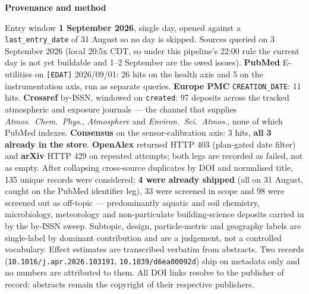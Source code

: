 \documentclass[10pt]{article}
\begin{document}
\vspace{4mm}
\begin{keybox}
{\sffamily\bfseries\footnotesize\color{Deep}Provenance and method}\\[1.2mm]
{\fontsize{7.2}{8.8}\selectfont
Entry window \textbf{1 September 2026}, single day, opened against a
\texttt{last\_entry\_date} of 31 August so no day is skipped. Sources queried on
3 September 2026 (local 20:5x CDT, so under this pipeline's 22:00 rule the current day is
not yet buildable and 1--2 September are the owed issues).
\textbf{PubMed} E-utilities on \texttt{[EDAT]} 2026/09/01: 26 hits on the health axis and
5 on the instrumentation axis, run as separate queries.
\textbf{Europe PMC} \texttt{CREATION\_DATE}: 11 hits.
\textbf{Crossref} by-ISSN, windowed on \texttt{created}: 97 deposits across the tracked
atmospheric and exposure journals --- the channel that supplies \textit{Atmos.\ Chem.\
Phys.}, \textit{Atmosphere} and \textit{Environ.\ Sci.\ Atmos.}, none of which PubMed
indexes.
\textbf{Consensus} on the sensor-calibration axis: 3 hits, \textbf{all 3 already in the
store}.
\textbf{OpenAlex} returned HTTP 403 (plan-gated date filter) and \textbf{arXiv} HTTP 429
on repeated attempts; both legs are recorded as failed, not as empty.
After collapsing cross-source duplicates by DOI and normalised title, 135 unique records
were considered; \textbf{4 were already shipped} (all on 31 August, caught on the PubMed
identifier leg), 33 were screened in scope and 98 were screened out as off-topic ---
predominantly aquatic and soil chemistry, microbiology, meteorology and non-particulate
building-science deposits carried in by the by-ISSN sweep.
Subtopic, design, particle-metric and geography labels are single-label by dominant
contribution and are a judgement, not a controlled vocabulary. Effect estimates are
transcribed verbatim from abstracts. Two records (\texttt{10.1016/j.apr.2026.103191},
\texttt{10.1039/d6ea00092d}) ship on metadata only and no numbers are attributed to them.
All DOI links resolve to the publisher of record; abstracts remain the copyright of their
respective publishers.\par}
\end{keybox}
\end{document}
